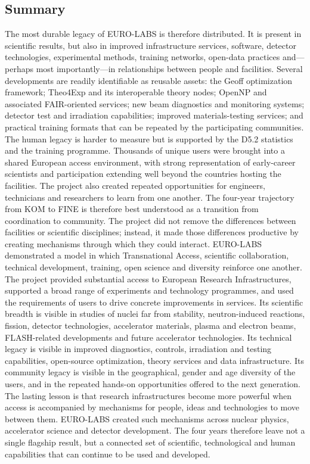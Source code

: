 \begin{itemize}
\section{Summary}
The most durable legacy of EURO-LABS is therefore distributed. It is present in scientific results, but also in improved infrastructure services, software, detector technologies, experimental methods, training networks, open-data practices and—perhaps most importantly—in relationships between people and facilities.
Several developments are readily identifiable as reusable assets: the Geoff optimization framework; Theo4Exp and its interoperable theory nodes; OpenNP and associated FAIR-oriented services; new beam diagnostics and monitoring systems; detector test and irradiation capabilities; improved materials-testing services; and practical training formats that can be repeated by the participating communities.
The human legacy is harder to measure but is supported by the D5.2 statistics and the training programme. Thousands of unique users were brought into a shared European access environment, with strong representation of early-career scientists and participation extending well beyond the countries hosting the facilities. The project also created repeated opportunities for engineers, technicians and researchers to learn from one another.
The four-year trajectory from KOM to FINE is therefore best understood as a transition from coordination to community. The project did not remove the differences between facilities or scientific disciplines; instead, it made those differences productive by creating mechanisms through which they could interact.
EURO-LABS demonstrated a model in which Transnational Access, scientific collaboration, technical development, training, open science and diversity reinforce one another. The project provided substantial access to European Research Infrastructures, supported a broad range of experiments and technology programmes, and used the requirements of users to drive concrete improvements in services.
Its scientific breadth is visible in studies of nuclei far from stability, neutron-induced reactions, fission, detector technologies, accelerator materials, plasma and electron beams, FLASH-related developments and future accelerator technologies. Its technical legacy is visible in improved diagnostics, controls, irradiation and testing capabilities, open-source optimization, theory services and data infrastructure. Its community legacy is visible in the geographical, gender and age diversity of the users, and in the repeated hands-on opportunities offered to the next generation.
The lasting lesson is that research infrastructures become more powerful when access is accompanied by mechanisms for people, ideas and technologies to move between them. EURO-LABS created such mechanisms across nuclear physics, accelerator science and detector development. The four years therefore leave not a single flagship result, but a connected set of scientific, technological and human capabilities that can continue to be used and developed.


\end{itemize}
